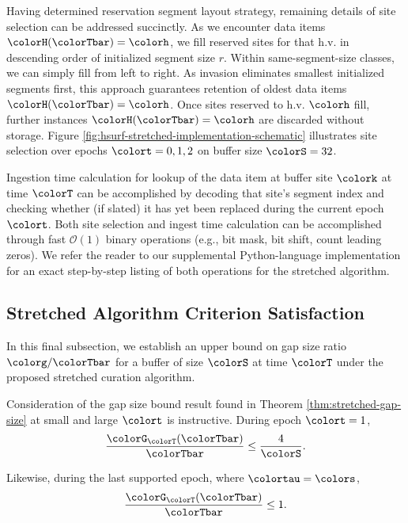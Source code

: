 Having determined reservation segment layout strategy, remaining details of site selection can be addressed succinctly.
As we encounter data items $\colorH(\colorTbar) = \colorh$, we fill reserved sites for that h.v. in descending order of initialized segment size $r$.
Within same-segment-size classes, we can simply fill from left to right.
As invasion eliminates smallest initialized segments first, this approach guarantees retention of oldest data items $\colorH(\colorTbar) = \colorh$.
Once sites reserved to h.v. $\colorh$ fill, further instances $\colorH(\colorTbar) = \colorh$ are discarded without storage.
Figure \ref{fig:hsurf-stretched-implementation-schematic} illustrates site selection over epochs $\colort=0,1,2$ on buffer size $\colorS=32$.

Ingestion time calculation for lookup of the data item at buffer site $\colork$ at time $\colorT$ can be accomplished by decoding that site's segment index and checking whether (if slated) it has yet been replaced during the current epoch $\colort$.
Both site selection and ingest time calculation can be accomplished through fast $\mathcal{O}(1)$ binary operations (e.g., bit mask, bit shift, count leading zeros).
We refer the reader to our supplemental Python-language implementation for an exact step-by-step listing of both operations for the stretched algorithm.

\subsection{Stretched Algorithm Criterion Satisfaction}
\label{sec:stretched-satisfaction}

In this final subsection, we establish an upper bound on gap size ratio $\colorg / \colorTbar$ for a buffer of size $\colorS$ at time $\colorT$ under the proposed stretched curation algorithm.



Consideration of the gap size bound result found in Theorem \ref{thm:stretched-gap-size} at small and large $\colort$ is instructive.
During epoch $\colort = 1$,
\begin{align*}
\frac{\colorG_{\colorT}(\colorTbar)}{\colorTbar}
\leq
\frac{4}{\colorS}.
\end{align*}

Likewise, during the last supported epoch, where $\colortau = \colors$,
\begin{align*}
\frac{\colorG_{\colorT}(\colorTbar)}{\colorTbar}
\leq
1.
\end{align*}

